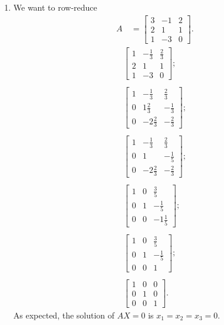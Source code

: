 \documentclass[12pt]{article}
\begin{document}
\begin{enumerate}
    \item
      We want to row-reduce
      \begin{align*}
        A\ & =
        \begin{bmatrix}
          3 & -1 & 2\\
          2 &  1 & 1\\
          1 & -3 & 0
        \end{bmatrix}.
      \end{align*}
      \begin{align*}
        \begin{bmatrix}
          1 & -\frac{1}{3} & \frac{2}{3}\\
          2 &  1 & 1\\
          1 & -3 & 0
        \end{bmatrix};\\\\
        \begin{bmatrix}
          1 & -\frac{1}{3}  & \frac{2}{3}\\
          0 &  1\frac{2}{3} & -\frac{1}{3}\\
          0 & -2\frac{2}{3} & -\frac{2}{3}
        \end{bmatrix};\\\\
        \begin{bmatrix}
          1 & -\frac{1}{3}  & \frac{2}{3}\\
          0 &  1            & -\frac{1}{5}\\
          0 & -2\frac{2}{3} & -\frac{2}{3}
        \end{bmatrix};\\\\
        \begin{bmatrix}
          1 & 0 & \frac{3}{5}\\
          0 & 1 & -\frac{1}{5}\\
          0 & 0 & -1\frac{1}{5}
        \end{bmatrix};\\\\
        \begin{bmatrix}
          1 & 0 & \frac{3}{5}\\
          0 & 1 & -\frac{1}{5}\\
          0 & 0 & 1
        \end{bmatrix};\\\\
        \begin{bmatrix}
          1 & 0 & 0\\
          0 & 1 & 0\\
          0 & 0 & 1
        \end{bmatrix}.
      \end{align*}
      As expected, the solution of $AX = 0$ is $x_1 = x_2 = x_3 =
      0$.
\end{enumerate}
\end{document}
